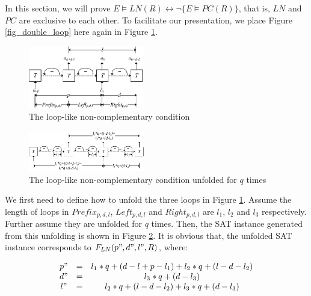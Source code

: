 \documentclass[journal]{IEEEtran}
\begin{document}
In this section,
we will prove $E\vDash LN(R)\leftrightarrow \neg \{E\vDash PC(R)\}$,
that is,
$LN$ and $PC$ are exclusive to each other.
To facilitate our presentation,
we place Figure \ref{fig_double_loop} here again in Figure \ref{fig_double_loop_again}.

\begin{figure}[t]
\begin{center}
\includegraphics[width=0.45\textwidth]{doubleloop}
\end{center}
\caption{The loop-like non-complementary condition}
  \label{fig_double_loop_again}
\end{figure}

\begin{figure}[b]
\begin{center}
\includegraphics[width=0.45\textwidth]{doubleloop_unfold}
\end{center}
\caption{The loop-like non-complementary condition unfolded for $q$ times}
  \label{fig_double_loop_unfold}
\end{figure}

We first need to define how to unfold the three loops in Figure \ref{fig_double_loop_again}.
Assume the length of loops in $Prefix_{p,d,l}$, $Left_{p,d,l}$ and $Right_{p,d,l}$ are $l_1$, $l_2$ and $l_3$ respectively.
Further assume they are unfolded for $q$ times.
Then,
the SAT instance generated from this unfolding is shown in Figure \ref{fig_double_loop_unfold}.
It is obvious that,
the unfolded SAT instance corresponds to $F_{LN}(p",d",l",R)$,
where:

\begin{equation}
\begin{array}{ccc}
p"&=&l_1*q+(d-l+p-l_1)+l_2*q+(l-d-l_2) \\
d"&=&l_3*q+(d-l_3) \\
l"&=&l_2*q+(l-d-l_2)+l_3*q+(d-l_3)
\end{array}
\end{equation}
\end{document}
